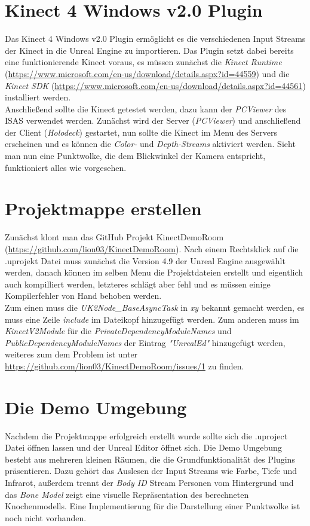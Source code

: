 \documentclass[a4paper]{IEEEtran}
\begin{document}
\section{Kinect 4 Windows v2.0 Plugin}
Das Kinect 4 Windows v2.0 Plugin ermöglicht es die verschiedenen Input Streams der Kinect in die Unreal Engine zu importieren. Das Plugin setzt dabei bereits eine funktionierende Kinect voraus, es müssen zunächst die {\textit{Kinect Runtime}} ({\url{https://www.microsoft.com/en-us/download/details.aspx?id=44559}}) und die {\textit{Kinect SDK}} ({\url{https://www.microsoft.com/en-us/download/details.aspx?id=44561}}) installiert werden. \\
Anschließend sollte die Kinect getestet werden, dazu kann der {\textit{PCViewer}} des ISAS verwendet werden. Zunächst wird der Server ({\textit{PCViewer}}) und anschließend der Client ({\textit{Holodeck}}) gestartet, nun sollte die Kinect im Menu des Servers erscheinen und es können die {\textit{Color-}} und {\textit{Depth-Streams}} aktiviert werden. Sieht man nun eine Punktwolke, die dem Blickwinkel der Kamera entspricht, funktioniert alles wie vorgesehen.\\

\section{Projektmappe erstellen}
Zunächst klont man das GitHub Projekt KinectDemoRoom ({\url{https://github.com/lion03/KinectDemoRoom}}). Nach einem Rechtsklick auf die .uprojekt Datei muss zunächst die Version 4.9 der Unreal Engine ausgewählt werden, danach können im selben Menu die Projektdateien erstellt und eigentlich auch kompilliert werden, letzteres schlägt aber fehl und es müssen einige Kompilerfehler von Hand behoben werden. \\
Zum einen muss die {\textit{UK2Node\_BaseAsyncTask}} in {\textit{xy}} bekannt gemacht werden, es muss eine Zeile {\textit{include}} im Dateikopf hinzugefügt werden. 
Zum anderen muss im {\textit{KinectV2Module}} für die {\textit{PrivateDependencyModuleNames}} und {\textit{PublicDependencyModuleNames}} der Eintrag {\textit{"{}UnrealEd"{}}} hinzugefügt werden, weiteres zum dem Problem ist unter {\url{https://github.com/lion03/KinectDemoRoom/issues/1}} zu finden.\\

\section{Die Demo Umgebung}
Nachdem die Projektmappe erfolgreich erstellt wurde sollte sich die .uproject Datei öffnen lassen und der Unreal Editor öffnet sich. Die Demo Umgebung besteht aus mehreren kleinen Räumen, die die Grundfunktionalität des Plugins präsentieren. Dazu gehört das Auslesen der Input Streams wie Farbe, Tiefe und Infrarot, außerdem trennt der {\textit{Body ID}} Stream Personen vom Hintergrund und das {\textit{Bone Model}} zeigt eine visuelle Repräsentation des berechneten Knochenmodells. Eine Implementierung für die Darstellung einer Punktwolke ist noch nicht vorhanden. \\
\end{document}
